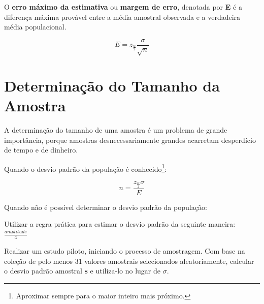 O \textbf{erro máximo da estimativa} ou \textbf{margem de erro}, denotada por \textbf{E} é a diferença máxima provável entre a média amostral observada e a verdadeira média populacional.

\[E = z_\frac{\alpha}{2}\frac{\sigma}{\sqrt{n}}\]

\section{Determinação do Tamanho da Amostra}

A determinação do tamanho de uma amostra é um problema de grande importância, porque amostras desnecessariamente grandes acarretam desperdício de tempo e de dinheiro.

Quando o desvio padrão da população é conhecido\footnote{Aproximar sempre para o maior inteiro mais próximo.}:

\[ n = \frac{z_\frac{\alpha}{2}\sigma}{E}\]

Quando não é possível determinar o desvio padrão da população:
\begin{alineas}
	\item Utilizar a regra prática para estimar o desvio padrão da seguinte maneira: \( \frac{amplitude}{4} \)
	\item Realizar um estudo piloto, iniciando o processo de amostragem. Com base na coleção de pelo menos 31 valores amostrais selecionados aleatoriamente, calcular o desvio padrão amostral \textbf{s} e utiliza-lo no lugar de \(\sigma\).
\end{alineas}



